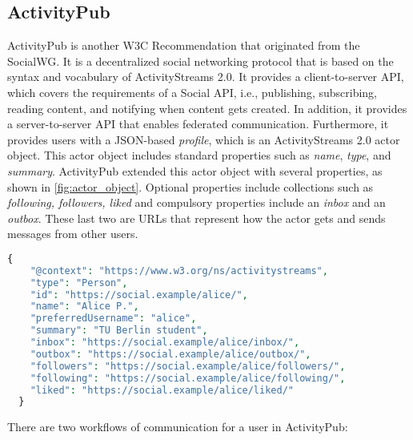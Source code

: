 \subsection{ActivityPub}\label{subsec:activitypub}

ActivityPub is another W3C Recommendation that originated from the SocialWG. It is a decentralized social networking protocol that is based on the syntax and vocabulary of ActivityStreams 2.0. It provides a client-to-server API, which covers the requirements of a Social API\cite{guy_2017}, i.e., publishing, subscribing, reading content, and notifying when content gets created. In addition, it provides a server-to-server API that enables federated communication. Furthermore, it provides users with a JSON-based \emph{profile}, which is an ActivityStreams 2.0 actor object. This actor object includes standard properties such as \emph{name}, \emph{type}, and \emph{summary}. ActivityPub extended this actor object with several properties, as shown in \ref{fig:actor_object}. Optional properties include collections such as \emph{following, followers, liked} and compulsory properties include an \emph{inbox} and an \emph{outbox}. These last two are URLs that represent how the actor gets and sends messages from other users.


\lstset{style=JSONStyle}
\begin{lstlisting}[language=PHP, caption=Actor object example in ActivityPub \cite{lemmer-webber_tallon_guy_prodromou_2018}, label=fig:actor_object, float=h!]
  {
    "@context": "https://www.w3.org/ns/activitystreams",
    "type": "Person",
    "id": "https://social.example/alice/",
    "name": "Alice P.",
    "preferredUsername": "alice",
    "summary": "TU Berlin student",
    "inbox": "https://social.example/alice/inbox/",
    "outbox": "https://social.example/alice/outbox/",
    "followers": "https://social.example/alice/followers/",
    "following": "https://social.example/alice/following/",
    "liked": "https://social.example/alice/liked/"
  }
\end{lstlisting}

There are two workflows of communication for a user in ActivityPub: 

